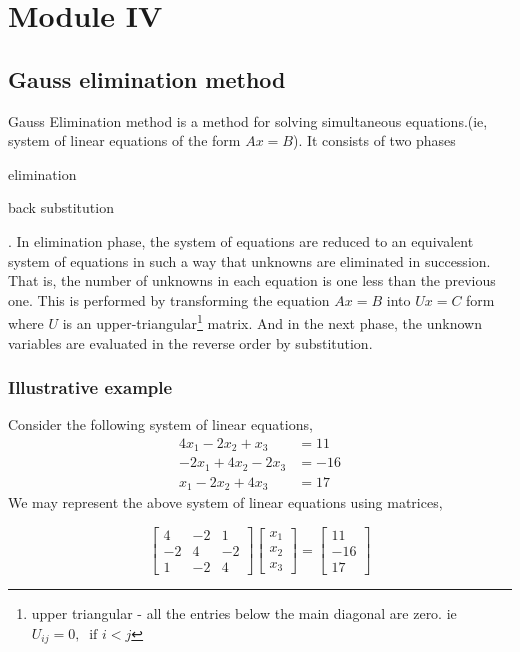 \chapter{Module IV}

\section{Gauss elimination method}
	Gauss Elimination method is a method for solving simultaneous equations.(ie, system of linear equations of the form $Ax = B$). It consists of two phases \begin{enumerate*} \item elimination \item back substitution \end{enumerate*}. In elimination phase, the system of equations are reduced to an equivalent system of equations in such a way that unknowns are eliminated in succession. That is, the number of unknowns in each equation is one less than the previous one. This is performed by transforming the equation $Ax = B$ into $Ux = C$ form where $U$ is an upper-triangular\footnote{upper triangular - all the entries below the main diagonal are zero. ie $U_{ij} = 0,\ \text{ if }i<j$} matrix. And in the next phase, the unknown variables are evaluated in the reverse order by substitution.

\subsection{Illustrative example}
	Consider the following system of linear equations,
	\begin{align}
		4x_1  - 2x_2  + x_3 & = 11 \label{eqn:a1}\\
		-2x_1  + 4x_2 - 2x_3 & = -16 \label{eqn:a2}\\
		x_1  - 2x_2 + 4x_3 & = 17 \label{eqn:a3}
	\end{align} 
	We may represent the above system of linear equations using matrices,

	\[ \begin{bmatrix} 4 & -2 & 1 \\ -2 & 4 & -2 \\ 1 & -2 & 4 \end{bmatrix} \begin{bmatrix} x_1 \\ x_2 \\ x_3 \end{bmatrix} = \begin{bmatrix} 11 \\ -16 \\ 17 \end{bmatrix} \]

